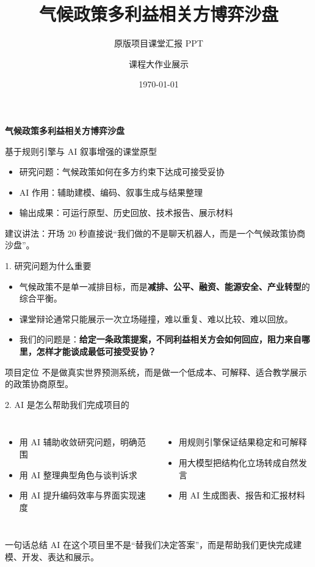 \documentclass[aspectratio=169,11pt]{ctexbeamer}
\title{气候政策多利益相关方博弈沙盘}
\subtitle{原版项目课堂汇报 PPT}
\author{课程大作业展示}
\date{\today}
\begin{document}
\begin{frame}[plain]
  \vspace{1.2cm}
  {\Huge\color{main}\bfseries 气候政策多利益相关方博弈沙盘}\par
  \vspace{0.4cm}
  {\Large\color{textgray}基于规则引擎与 AI 叙事增强的课堂原型}\par
  \vspace{0.8cm}
  \begin{itemize}
    \item 研究问题：气候政策如何在多方约束下达成可接受妥协
    \item AI 作用：辅助建模、编码、叙事生成与结果整理
    \item 输出成果：可运行原型、历史回放、技术报告、展示材料
  \end{itemize}
  \vfill
  {\small \color{accent}建议讲法：开场 20 秒直接说“我们做的不是聊天机器人，而是一个气候政策协商沙盘”。}
\end{frame}

\begin{frame}{1. 研究问题为什么重要}
\begin{itemize}
  \item 气候政策不是单一减排目标，而是\textbf{减排、公平、融资、能源安全、产业转型}的综合平衡。
  \item 课堂辩论通常只能展示一次立场碰撞，难以重复、难以比较、难以回放。
  \item 我们的问题是：\textbf{给定一条政策提案，不同利益相关方会如何回应，阻力来自哪里，怎样才能谈成最低可接受妥协？}
\end{itemize}
\begin{block}{项目定位}
不是做真实世界预测系统，而是做一个低成本、可解释、适合教学展示的政策协商原型。
\end{block}
\end{frame}

\begin{frame}{2. AI 是怎么帮助我们完成项目的}
\begin{columns}[T]
\begin{itemize}
  \item 用 AI 辅助收敛研究问题，明确范围
  \item 用 AI 整理典型角色与谈判诉求
  \item 用 AI 提升编码效率与界面实现速度
\end{itemize}
\begin{itemize}
  \item 用规则引擎保证结果稳定和可解释
  \item 用大模型把结构化立场转成自然发言
  \item 用 AI 生成图表、报告和汇报材料
\end{itemize}
\end{columns}
\begin{alertblock}{一句话总结}
AI 在这个项目里不是“替我们决定答案”，而是帮助我们更快完成建模、开发、表达和展示。
\end{alertblock}
\end{frame}
\end{document}
